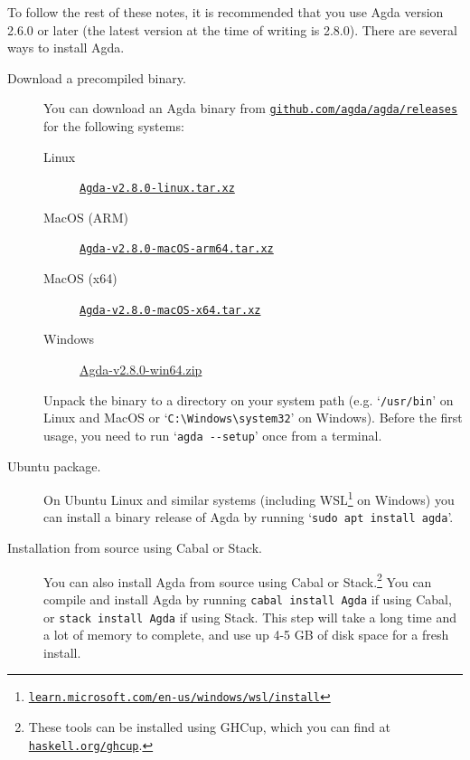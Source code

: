 \documentclass[a4paper,UKenglish]{tufte-handout}
\newcommand{\hrefu}[2]{\href{#1}{\nolinkurl{#2}}}
\theoremstyle{definition}
\begin{document}
To follow the rest of these notes, it is recommended that you use Agda
version 2.6.0 or later (the latest version at the time of writing is 2.8.0). There are several ways to install Agda.
\begin{description}
  \item[Download a precompiled binary.] You can download an Agda binary from \hrefu{https://github.com/agda/agda/releases}{github.com/agda/agda/releases} for the following systems:
    \begin{description}
      \item[Linux] \hrefu{https://github.com/agda/agda/releases/download/v2.8.0/Agda-v2.8.0-linux.tar.xz}{Agda-v2.8.0-linux.tar.xz}
      \item[MacOS (ARM)] \hrefu{https://github.com/agda/agda/releases/download/v2.8.0/Agda-v2.8.0-macOS-arm64.tar.xz}{Agda-v2.8.0-macOS-arm64.tar.xz}
      \item[MacOS (x64)] \hrefu{https://github.com/agda/agda/releases/download/v2.8.0/Agda-v2.8.0-macOS-x64.tar.xz}{Agda-v2.8.0-macOS-x64.tar.xz}
      \item[Windows] \href{https://github.com/agda/agda/releases/download/v2.8.0/Agda-v2.8.0-win64.zip}{Agda-v2.8.0-win64.zip}
    \end{description}
    Unpack the binary to a directory on your system path (e.g. `\texttt{/usr/bin}' on Linux and MacOS or `\texttt{C:\textbackslash{}Windows\textbackslash{}system32}' on Windows).
    Before the first usage, you need to run `\texttt{agda -{}-setup}' once from a terminal.

  \item[Ubuntu package.] On Ubuntu Linux and similar systems
    (including
    WSL\footnote{\hrefu{https://learn.microsoft.com/en-us/windows/wsl/install}{learn.microsoft.com/en-us/windows/wsl/install}}
    on Windows) you can install a binary release of Agda by running
    `\texttt{sudo apt install agda}'.

  \item[Installation from source using Cabal or Stack.] You can also
    install Agda from source using Cabal or Stack.\footnote{These
    tools can be installed using GHCup, which you can find at
    \hrefu{https://www.haskell.org/ghcup/}{haskell.org/ghcup}.}  You
    can compile and install Agda by running \texttt{cabal install
      Agda} if using Cabal, or \texttt{stack install Agda} if using
    Stack.  This step will take a long time and a lot of memory to
    complete, and use up 4-5 GB of disk space for a fresh install.
\end{description}
\end{document}
